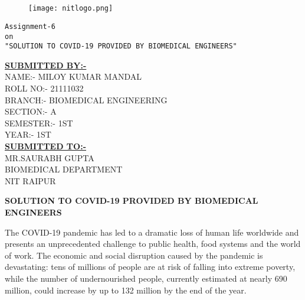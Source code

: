 \documentclass[12pt,a4paper]{report}
\begin{document}
 


\begin{center}
    \Large{}\\
\end{center}

\begin{center}
    \Large{}\\ 
\end{center}

\begin{figure}
    \centering
    \texttt{[image: nitlogo.png]}
\end{figure}

\begin{center}
   \huge{\texttt{Assignment-6\\ on\\ "SOLUTION TO COVID-19 PROVIDED BY BIOMEDICAL ENGINEERS"}}
  \end{center}
 
  
\begin{center}
\textbf{\underline{SUBMITTED BY:-}}\\

NAME:- MILOY KUMAR MANDAL\\
ROLL NO:- 21111032\\
BRANCH:- BIOMEDICAL ENGINEERING\\
SECTION:- A\\
SEMESTER:- 1ST\\
YEAR:- 1ST\\

\textbf{\underline{SUBMITTED TO:-}}\\
MR.SAURABH GUPTA\\
BIOMEDICAL DEPARTMENT\\
NIT RAIPUR\\


 
\end{center} 
\clearpage

\begin{center}
  \huge{\textbf{SOLUTION TO COVID-19 PROVIDED BY BIOMEDICAL ENGINEERS}}
\end{center}

The COVID-19 pandemic has led to a dramatic loss of human life worldwide and presents an unprecedented challenge to public health, food systems and the world of work. The economic and social disruption caused by the pandemic is devastating: tens of millions of people are at risk of falling into extreme poverty, while the number of undernourished people, currently estimated at nearly 690 million, could increase by up to 132 million by the end of the year.\par
\end{document}
